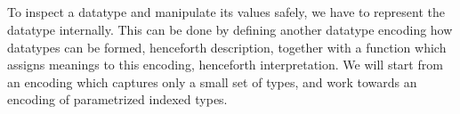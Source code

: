 \begin{code}[hide] %
\>[0]\AgdaSpace{}%
\AgdaSpace{}%
\<%
\\
%
\\[\AgdaEmptyExtraSkip]%
\>[0]\AgdaSpace{}%
\AgdaSpace{}%
\AgdaSpace{}%
\AgdaSpace{}%
\AgdaSymbol{(}\AgdaSpace{}%
\AgdaSpace{}%
\AgdaSymbol{)}\<%
\\
\>[0]\AgdaSpace{}%
\AgdaSpace{}%
\AgdaSpace{}%
\AgdaSpace{}%
\AgdaSymbol{(}\AgdaSpace{}%
\AgdaSpace{}%
\AgdaSymbol{;}\AgdaSpace{}%
\AgdaSpace{}%
\AgdaSpace{}%
\AgdaSymbol{;}\AgdaSpace{}%
\AgdaSpace{}%
\AgdaSpace{}%
\AgdaSymbol{)}\<%
\\
\>[0]\AgdaSpace{}%
\AgdaSpace{}%
\<%
\\
\>[0]\AgdaSpace{}%
\AgdaSpace{}%
\<%
\\
\>[0]\AgdaSpace{}%
\AgdaSpace{}%
\<%
\\
\>[0]\AgdaSpace{}%
\AgdaSpace{}%
\AgdaSpace{}%
\AgdaSpace{}%
\AgdaSymbol{(}\AgdaSymbol{)}\<%
\\
\>[0]\AgdaSpace{}%
\AgdaSpace{}%
\<%
\\
\>[0]\AgdaSpace{}%
\AgdaSpace{}%
\<%
\end{code}

To inspect a datatype and manipulate its values safely, we have to represent the datatype internally. This can be done by defining another datatype encoding how datatypes can be formed, henceforth description, together with a function which assigns meanings to this encoding, henceforth interpretation. We will start from an encoding which captures only a small set of types, and work towards an encoding of parametrized indexed types.

